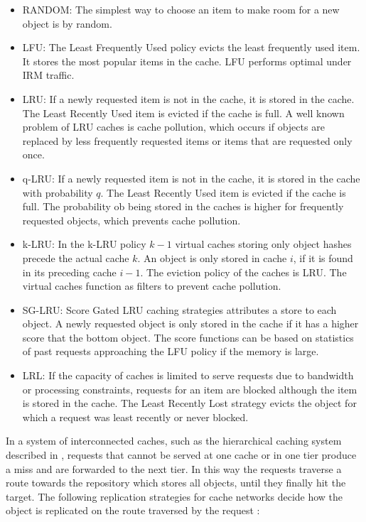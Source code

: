 \begin{itemize}
  \itemsep0em
  \item RANDOM: The simplest way to choose an item to make room for a new object is by random.
  \item LFU: The Least Frequently Used policy evicts the least frequently used item.
  It stores the most popular items in the cache.
  LFU performs optimal under IRM traffic.
  \item LRU: If a newly requested item is not in the cache, it is stored in the cache. The Least Recently Used item is evicted if the cache is full.
  A well known problem of LRU caches is cache pollution, which occurs if objects are replaced by less frequently requested items or items that are requested only once.
  \item q-LRU: If a newly requested item is not in the cache, it is stored in the cache with probability $q$. The Least Recently Used item is evicted if the cache is full.
  The probability ob being stored in the caches is higher for frequently requested objects, which prevents cache pollution. \cite{martina2014unified}
  \item k-LRU: In the k-LRU policy $k-1$ virtual caches storing only object hashes precede the actual cache $k$. An object is only stored in cache $i$, if it is found in its preceding cache $i-1$. The eviction policy of the caches is LRU.
  The virtual caches function as filters to prevent cache pollution. \cite{martina2014unified}
  \item SG-LRU: Score Gated LRU caching strategies attributes a store to each object. A newly requested object is only stored in the cache if it has a higher score that the bottom object. The score functions can be based on statistics of past requests approaching the LFU policy if the memory is large. \cite{hasslinger2014caching}
  \item LRL: If the capacity of caches is limited to serve requests due to bandwidth or processing constraints, requests for an item are blocked although the item is stored in the cache. The Least Recently Lost strategy evicts the object for which a request was least recently or never blocked. \cite{leconte2014adaptive}
\end{itemize}

In a system of interconnected caches, such as the hierarchical caching system described in , requests that cannot be served at one cache or in one tier produce a miss and are forwarded to the next tier.
In this way the requests traverse a route towards the repository which stores all objects, until they finally hit the target.
The following replication strategies for cache networks decide how the object is replicated on the route traversed by the request \cite{rossini2014coupling,martina2014unified}:

